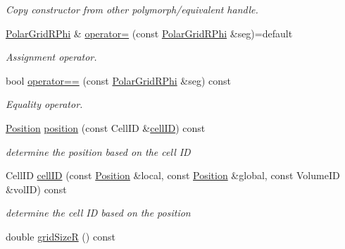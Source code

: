 \begin{DoxyCompactItemize}
\begin{DoxyCompactList}\small\item\em Copy constructor from other polymorph/equivalent handle. \end{DoxyCompactList}\item 
\hyperlink{class_d_d4hep_1_1_geometry_1_1_polar_grid_r_phi}{Polar\+Grid\+R\+Phi} \& \hyperlink{class_d_d4hep_1_1_geometry_1_1_polar_grid_r_phi_a73997fc60dc8ba576bf87ed28807407f}{operator=} (const \hyperlink{class_d_d4hep_1_1_geometry_1_1_polar_grid_r_phi}{Polar\+Grid\+R\+Phi} \&seg)=default
\begin{DoxyCompactList}\small\item\em Assignment operator. \end{DoxyCompactList}\item 
bool \hyperlink{class_d_d4hep_1_1_geometry_1_1_polar_grid_r_phi_ae3664aba8edb5800ce3334bcdeb9629b}{operator==} (const \hyperlink{class_d_d4hep_1_1_geometry_1_1_polar_grid_r_phi}{Polar\+Grid\+R\+Phi} \&seg) const
\begin{DoxyCompactList}\small\item\em Equality operator. \end{DoxyCompactList}\item 
\hyperlink{namespace_d_d4hep_1_1_geometry_a55083902099d03506c6db01b80404900}{Position} \hyperlink{class_d_d4hep_1_1_geometry_1_1_polar_grid_r_phi_ad8dd167177762384cb8cc49a97ad965d}{position} (const Cell\+ID \&\hyperlink{class_d_d4hep_1_1_geometry_1_1_polar_grid_r_phi_a046347fac14370939120a716b606d5cb}{cell\+ID}) const
\begin{DoxyCompactList}\small\item\em determine the position based on the cell ID \end{DoxyCompactList}\item 
Cell\+ID \hyperlink{class_d_d4hep_1_1_geometry_1_1_polar_grid_r_phi_a046347fac14370939120a716b606d5cb}{cell\+ID} (const \hyperlink{namespace_d_d4hep_1_1_geometry_a55083902099d03506c6db01b80404900}{Position} \&local, const \hyperlink{namespace_d_d4hep_1_1_geometry_a55083902099d03506c6db01b80404900}{Position} \&global, const Volume\+ID \&vol\+ID) const
\begin{DoxyCompactList}\small\item\em determine the cell ID based on the position \end{DoxyCompactList}\item 
double \hyperlink{class_d_d4hep_1_1_geometry_1_1_polar_grid_r_phi_ae8f84e4c7d2e10f33741ec1a4dfe76cc}{grid\+SizeR} () const

\end{DoxyCompactItemize}
